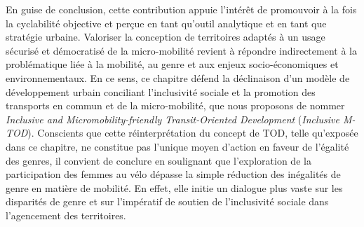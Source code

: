 \begin{refsegment}
En guise de conclusion, cette contribution appuie l'intérêt de promouvoir à la fois la cyclabilité objective et perçue en tant qu'outil analytique et en tant que stratégie urbaine. Valoriser la conception de territoires adaptés à un usage sécurisé et démocratisé de la micro-mobilité revient à répondre indirectement à la problématique liée à la mobilité, au genre et aux enjeux socio-économiques et environnementaux. En ce sens, ce chapitre défend la déclinaison d'un modèle de développement urbain conciliant l'inclusivité sociale et la promotion des transports en commun et de la micro-mobilité, que nous proposons de nommer \textsl{Inclusive and Micromobility-friendly Transit-Oriented Development} (\textsl{Inclusive \acrshort{M-TOD}}). Conscients que cette réinterprétation du concept de \acrshort{TOD}, telle qu'exposée dans ce chapitre, ne constitue pas l'unique moyen d'action en faveur de l'égalité des genres, il convient de conclure en soulignant que l'exploration de la participation des femmes au vélo dépasse la simple réduction des inégalités de genre en matière de mobilité. En effet, elle initie un dialogue plus vaste sur les disparités de genre \textcolor{blue}{\autocite{sammito_closing_2023}} et sur l'impératif de soutien de l'inclusivité sociale dans l'agencement des territoires.%

     \newpage
     

\end{refsegment}
